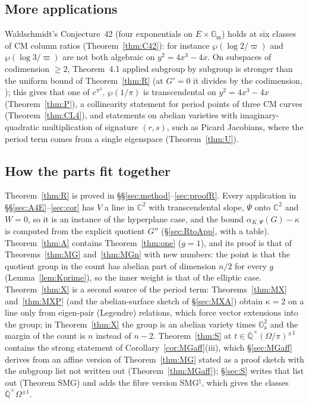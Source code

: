 \documentclass[11pt]{amsart}
\theoremstyle{definition}
\newcommand{\Qb}{\overline{\mathbb{Q}}}
\newcommand{\C}{\mathbb{C}}
\newcommand{\Ga}{\mathbb{G}_{\mathrm a}}
\newcommand{\Gm}{\mathbb{G}_{\mathrm m}}
\newcommand{\vp}{\varpi}
\begin{document}
\subsection*{More applications}
Waldschmidt's Conjecture~42 \cite{W06} (four exponentials on $E\times\Gm$) holds at six classes of CM column ratios
(Theorem~\ref{thm:C42}): for instance $\wp(\log2/\vp)$ and $\wp(\log3/\vp)$ are not both algebraic on $y^2=4x^3-4x$. On
subspaces of codimension $\ge2$, Theorem~4.1 applied subgroup by subgroup is stronger than the uniform bound of
Theorem~\ref{thm:R} (at $G'=0$ it divides by the codimension, \cite[(4.2)]{W88}); this gives that one of $e^{\pi^2}$,
$\wp(1/\pi)$ is transcendental on $y^2=4x^3-4x$ (Theorem~\ref{thm:P}), a collinearity statement for period points of three
CM curves (Theorem~\ref{thm:CL4}), and statements on abelian varieties with imaginary-quadratic multiplication of signature
$(r,s)$, such as Picard Jacobians, where the period term comes from a single eigenspace (Theorem~\ref{thm:U}).

\subsection*{How the parts fit together}
Theorem~\ref{thm:R} is proved in \S\S\ref{sec:method}--\ref{sec:proofR}. Every application in \S\S\ref{sec:A4E}--\ref{sec:cor}
has $V$ a line in $\C^2$ with transcendental slope, $\Psi$ onto $\C^2$ and $W=0$, so it is an instance of the hyperplane
case, and the bound $\alpha_{K,\Psi}(G)-\kappa$ is computed from the explicit quotient $G''$ (\S\ref{sec:RtoApp}, with a table).
Theorem~\ref{thm:A} contains Theorem~\ref{thm:one} ($g=1$), and its proof is that of Theorems~\ref{thm:MG}
and~\ref{thm:MGn} with new numbers: the point is that the quotient group in the count has abelian part of dimension $n/2$
for every $g$ (Lemma~\ref{lem:Kprime}), so the inner weight is that of the elliptic case. Theorem~\ref{thm:X} is a second
source of the period term: Theorems~\ref{thm:MX} and~\ref{thm:MXP} (and the abelian-surface sketch of \S\ref{sec:MXA})
obtain $\kappa=2$ on a line only from eigen-pair (Legendre) relations, which force vector extensions into the group; in
Theorem~\ref{thm:X} the group is an abelian variety times $\Ga^2$ and the margin of the count is $n$ instead of $n-2$.
Theorem~\ref{thm:S} at $t\in\Qb^\times(\Omega/\pi)^{\pm1}$ contains the strong statement of Corollary~\ref{cor:MGaff}(iii),
which \S\ref{sec:MGaff} derives from an affine version of Theorem~\ref{thm:MG} stated as a proof sketch with the subgroup
list not written out (Theorem~\ref{thm:MGaff}); \S\ref{sec:S} writes that list out (Theorem SMG) and adds the fibre
version SMG$^\natural$, which gives the classes $\Qb^\times\Omega^{\pm1}$.
\end{document}
